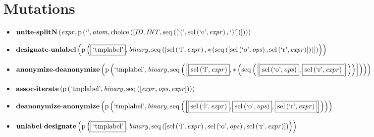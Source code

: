 \section{Mutations}
{\footnotesize\begin{itemize}
\item $\mathbf{unite\text{-}splitN}\left(\mathit{expr},\\\mathrm{p}\left(\text{`'},\mathit{atom},\mathrm{choice}\left(\left[\mathit{ID}, \mathit{INT}, \mathrm{seq}\left(\left[\text{`('}, \mathrm{sel}\left(\text{`e'},\mathit{expr}\right), \text{`)'}\right]\right)\right]\right)\right)\right)$
\item $\mathbf{designate\text{-}unlabel}\\\left(\mathrm{p}\left(\fbox{\text{`tmplabel'}},\mathit{binary},\mathrm{seq}\left(\left[\mathrm{sel}\left(\text{`l'},\mathit{expr}\right), {*}\left(\mathrm{seq}\left(\left[\mathrm{sel}\left(\text{`o'},\mathit{ops}\right), \mathrm{sel}\left(\text{`r'},\mathit{expr}\right)\right]\right)\right)\right]\right)\right)\right)$
\item $\mathbf{anonymize\text{-}deanonymize}\\\left(\mathrm{p}\left(\text{`tmplabel'},\mathit{binary},\mathrm{seq}\left(\left[\fbox{$\mathrm{sel}\left(\text{`l'},\mathit{expr}\right)$}, {*}\left(\mathrm{seq}\left(\left[\fbox{$\mathrm{sel}\left(\text{`o'},\mathit{ops}\right)$}, \fbox{$\mathrm{sel}\left(\text{`r'},\mathit{expr}\right)$}\right]\right)\right)\right]\right)\right)\right)$
\item $\mathbf{assoc\text{-}iterate}\\\left(\mathrm{p}\left(\text{`tmplabel'},\mathit{binary},\mathrm{seq}\left(\left[\mathit{expr}, \mathit{ops}, \mathit{expr}\right]\right)\right)\right)$
\item $\mathbf{deanonymize\text{-}anonymize}\\\left(\mathrm{p}\left(\text{`tmplabel'},\mathit{binary},\mathrm{seq}\left(\left[\fbox{$\mathrm{sel}\left(\text{`l'},\mathit{expr}\right)$}, \fbox{$\mathrm{sel}\left(\text{`o'},\mathit{ops}\right)$}, \fbox{$\mathrm{sel}\left(\text{`r'},\mathit{expr}\right)$}\right]\right)\right)\right)$
\item $\mathbf{unlabel\text{-}designate}\\\left(\mathrm{p}\left(\fbox{\text{`tmplabel'}},\mathit{binary},\mathrm{seq}\left(\left[\mathrm{sel}\left(\text{`l'},\mathit{expr}\right), \mathrm{sel}\left(\text{`o'},\mathit{ops}\right), \mathrm{sel}\left(\text{`r'},\mathit{expr}\right)\right]\right)\right)\right)$
\end{itemize}}

